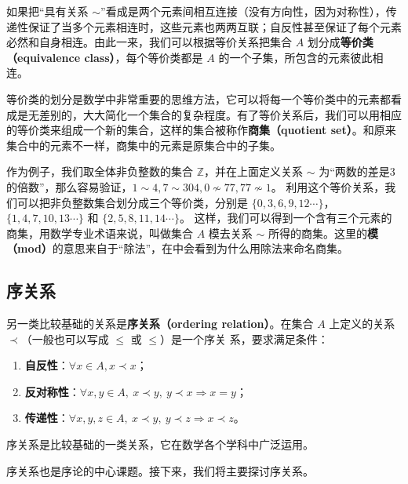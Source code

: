 如果把“具有关系 $\sim$”看成是两个元素间相互连接（没有方向性，因为对称性），传递性保证了当多个元素相连时，这些元素也两两互联；自反性甚至保证了每个元素必然和自身相连。由此一来，我们可以根据等价关系把集合 $A$ 划分成\textbf{等价类（equivalence class）}，每个等价类都是 $A$ 的一个子集，所包含的元素彼此相连。

等价类的划分是数学中非常重要的思维方法，它可以将每一个等价类中的元素都看成是无差别的，大大简化一个集合的复杂程度。有了等价关系后，我们可以用相应的等价类来组成一个新的集合，这样的集合被称作\textbf{商集（quotient set）}。和原来集合中的元素不一样，商集中的元素是原集合中的子集。

作为例子，我们取全体非负整数的集合 $\mathbb{Z}$，并在上面定义关系 $\sim$ 为“两数的差是3的倍数”，那么容易验证，$1\sim4, 7\sim304, 0\not\sim 77, 77\not\sim 1$。 利用这个等价关系，我们可以把非负整数集合划分成三个等价类，分别是 $\{0, 3, 6, 9, 12\cdots \}$，$\{1, 4, 7, 10, 13\cdots\}$ 和 $\{2, 5, 8, 11, 14\cdots\}$。 这样，我们可以得到一个含有三个元素的商集，用数学专业术语来说，叫做集合 $A$ 模去关系 $\sim$ 所得的商集。这里的\textbf{模（mod）}的意思来自于“除法”，在中会看到为什么用除法来命名商集。

\subsection{序关系}\label{sub_Relat_2}

另一类比较基础的关系是\textbf{序关系（ordering relation）}。在集合 $A$ 上定义的关系 $\prec$（一般也可以写成 $\leq$ 或 $\leqslant$）是一个序关
系，要求满足条件：
\begin{enumerate}
\item \textbf{自反性}：$\forall x\in A,x\prec x$；
\item \textbf{反对称性}：$\forall x,y\in A,\ x\prec y,\ y\prec x \Rightarrow x = y $；
\item \textbf{传递性}：$\forall x,y,z\in A,\ x\prec y,\ y\prec z \Rightarrow x\prec z $。
\end{enumerate}

序关系是比较基础的一类关系，它在数学各个学科中广泛运用。

序关系也是序论的中心课题。接下来，我们将主要探讨序关系。

